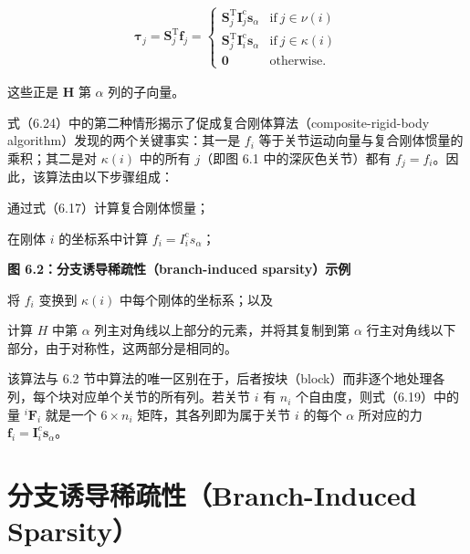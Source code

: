 \documentclass[10pt,a4paper]{book}
\theoremstyle{thmstyle} %
\theoremstyle{defstyle} %
\theoremstyle{prostyle} %
\begin{document}
$$
\begin{array}{r} { \boldsymbol { \tau } _ { j } = \boldsymbol { S } _ { j } ^{\mathrm { T} } \boldsymbol { f } _ { j } = \left\{ \begin{array}{ll} { \boldsymbol { S } _ { j } ^{\mathrm { T} } \boldsymbol { I } _ { j } ^{\mathrm { c} } \boldsymbol { s } _ { \alpha } } & { \mathrm { i f ~ } j \in \nu ( i ) } \\{ \boldsymbol { S } _ { j } ^{\mathrm { T} } \boldsymbol { I } _ { i } ^{\mathrm { c} } \boldsymbol { s } _ { \alpha } } & { \mathrm { i f ~ } j \in \kappa ( i ) } \\{ \boldsymbol { 0 } } & { \mathrm { o t h e r w i s e } . } \end{array} \right. } \end{array}
$$



这些正是 $\mathbf{H}$ 第 $\alpha$ 列的子向量。



式（6.24）中的第二种情形揭示了促成复合刚体算法（composite-rigid-body algorithm）发现的两个关键事实：其一是 $f_i$ 等于关节运动向量与复合刚体惯量的乘积；其二是对 $\kappa(i)$ 中的所有 $j$（即图 6.1 中的深灰色关节）都有 $f_j = f_i$。因此，该算法由以下步骤组成：



通过式（6.17）计算复合刚体惯量；



在刚体 $i$ 的坐标系中计算 $f_{i} = I_{i}^{\mathrm{c}} s_{\alpha}$；



\noindent\textbf{图 6.2：分支诱导稀疏性（branch-induced sparsity）示例}





将 $f_{i}$ 变换到 $\kappa(i)$ 中每个刚体的坐标系；以及



计算 $H$ 中第 $\alpha$ 列主对角线以上部分的元素，并将其复制到第 $\alpha$ 行主对角线以下部分，由于对称性，这两部分是相同的。



该算法与 6.2 节中算法的唯一区别在于，后者按块（block）而非逐个地处理各列，每个块对应单个关节的所有列。若关节 $i$ 有 $n_i$ 个自由度，则式（6.19）中的量 ${}^i\boldsymbol{F}_i$ 就是一个 $6 \times n_i$ 矩阵，其各列即为属于关节 $i$ 的每个 $\alpha$ 所对应的力 $\boldsymbol{f}_i = \boldsymbol{I}_i^c\boldsymbol{s}_\alpha$。



\section{分支诱导稀疏性（Branch-Induced Sparsity）}
\end{document}
